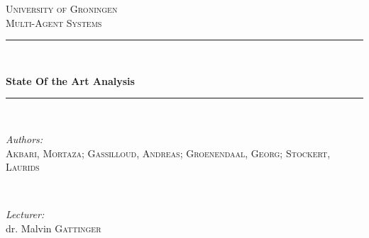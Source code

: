 \begin{titlepage}

\newcommand{\HRule}{\rule{\linewidth}{0.5mm}} %

\center %
 

\textsc{\LARGE University of Groningen}\\[1.5cm] %
\textsc{\Large Multi-Agent Systems}\\[0.5cm] %


\HRule \\[0.4cm]
{ \huge \bfseries State Of the Art Analysis\\[0.4cm] %
\HRule \\[1.5cm]
 

\begin{minipage}{0.4\textwidth}
\begin{flushleft} \large
\emph{Authors:}\\
\textsc{Akbari, Mortaza;  Gassilloud, Andreas; Groenendaal, Georg; Stockert, Laurids}

\end{flushleft}
\end{minipage}
~
\begin{minipage}{0.4\textwidth}
\begin{flushright} \large
\emph{Lecturer:} \\
dr. Malvin \textsc{Gattinger} \\
\end{flushright}
\end{minipage}\\[2cm]

}
\end{titlepage}
